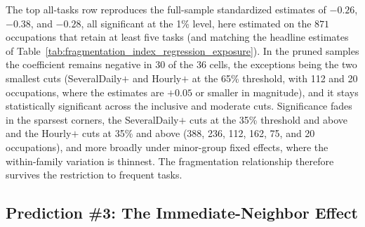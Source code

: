The top all-tasks row reproduces the full-sample standardized estimates of $-0.26$, $-0.38$, and $-0.28$, all significant at the 1\% level, here estimated on the $871$ occupations that retain at least five tasks (and matching the headline estimates of Table~\ref{tab:fragmentation_index_regression_exposure}).
In the pruned samples the coefficient remains negative in 30 of the 36 cells, the exceptions being the two smallest cuts (SeveralDaily$+$ and Hourly$+$ at the 65\% threshold, with 112 and 20 occupations, where the estimates are $+0.05$ or smaller in magnitude), and it stays statistically significant across the inclusive and moderate cuts.
Significance fades in the sparsest corners, the SeveralDaily$+$ cuts at the 35\% threshold and above and the Hourly$+$ cuts at 35\% and above (388, 236, 112, 162, 75, and 20 occupations), and more broadly under minor-group fixed effects, where the within-family variation is thinnest.
The fragmentation relationship therefore survives the restriction to frequent tasks.



\subsection{Prediction \#3: The Immediate-Neighbor Effect}
\label{app:frequency_robustness_neighbor}

